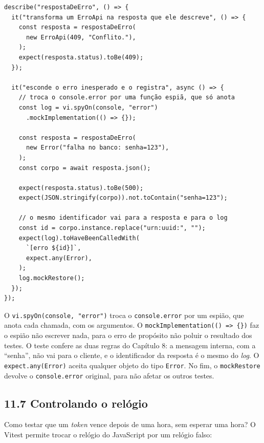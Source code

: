 \begin{codigo}
\begin{Verbatim}[breaklines=true, breaksymbolleft={}, fontsize=\footnotesize]
describe("respostaDeErro", () => {
  it("transforma um ErroApi na resposta que ele descreve", () => {
    const resposta = respostaDeErro(
      new ErroApi(409, "Conflito."),
    );
    expect(resposta.status).toBe(409);
  });

  it("esconde o erro inesperado e o registra", async () => {
    // troca o console.error por uma função espiã, que só anota
    const log = vi.spyOn(console, "error")
      .mockImplementation(() => {});

    const resposta = respostaDeErro(
      new Error("falha no banco: senha=123"),
    );
    const corpo = await resposta.json();

    expect(resposta.status).toBe(500);
    expect(JSON.stringify(corpo)).not.toContain("senha=123");

    // o mesmo identificador vai para a resposta e para o log
    const id = corpo.instance.replace("urn:uuid:", "");
    expect(log).toHaveBeenCalledWith(
      `[erro ${id}]`,
      expect.any(Error),
    );
    log.mockRestore();
  });
});
\end{Verbatim}
\end{codigo}

O \texttt{vi.spyOn(console, "error")} troca o \texttt{console.error} por um espião, que anota cada chamada, com os argumentos. O \texttt{mockImplementation(() => \{\})} faz o espião não escrever nada, para o erro de propósito não poluir o resultado dos testes. O teste confere as duas regras do Capítulo 8: a mensagem interna, com a ``senha'', não vai para o cliente, e o identificador da resposta é o mesmo do \textit{log}. O \texttt{expect.any(Error)} aceita qualquer objeto do tipo \texttt{Error}. No fim, o \texttt{mockRestore} devolve o \texttt{console.error} original, para não afetar os outros testes.

\subsection{11.7 Controlando o relógio}

Como testar que um \textit{token} vence depois de uma hora, sem esperar uma hora? O Vitest permite trocar o relógio do JavaScript por um relógio falso:

